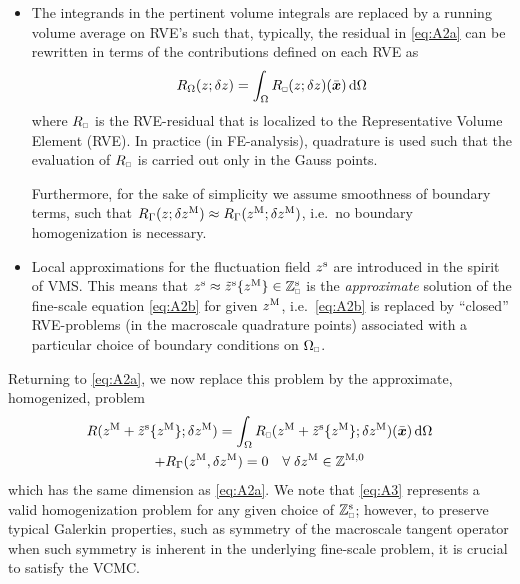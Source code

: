 \documentclass[MikaelDissertation.tex]{subfiles}
\begin{document}
\begin{itemize}
\item The integrands in the pertinent volume integrals are replaced by a running volume average on RVE's
such that, typically, the residual in \cref{eq:A2a} can be rewritten in terms of the contributions defined on each RVE as
\begin{align}
\label{eq:A106} R_\Omega(z;\delta z) = \int_\Omega R_\rve(z;\delta z)(\bar{\ta x})\dif\Omega
\end{align}
where $R_\rve$ is the RVE-residual that is localized to the Representative Volume Element (RVE).
In practice (in FE-analysis), quadrature is used such that the evaluation of $R_\rve$ is carried out only in the Gauss points.

Furthermore, for the sake of simplicity we assume smoothness of boundary terms, such that $R_\Gamma(z; \delta z^{\mathrm{M}}) \approx R_\Gamma(z^{\mathrm{M}};\delta z^{\mathrm{M}})$, i.e.\ no boundary homogenization is necessary.

\item Local approximations for the fluctuation field $z^{\mathrm{s}}$ are introduced in the spirit of VMS.
This means that $z^\fluct \approx \tilde{z}^\fluct\{z^\macro\}\in\set{Z}_\rve^{\fluct}$ is the \emph{approximate} solution of the fine-scale 
equation \cref{eq:A2b} for given $z^{\mathrm{M}}$, i.e.\ \cref{eq:A2b} is replaced by ``closed'' RVE-problems (in the macroscale quadrature points) associated with a particular choice of boundary conditions on $\Omega_\rve$.
\end{itemize}
Returning to \cref{eq:A2a}, we now replace this problem by the approximate, homogenized, problem
\begin{multline}
\label{eq:A3} R(z^\macro+\tilde{z}^\fluct\{z^\macro\};\delta z^\macro) = \int_\Omega R_\rve(z^\macro+\tilde{z}^\fluct\{z^\macro\};\delta z^\macro)(\bar{\ta x})\dif\Omega
 \\
 + R_\Gamma(z^\macro, \delta z^\macro) = 0 \quad \forall\;\delta z^\macro \in \set Z^{\macro,0}
\end{multline}
which has the same dimension as \cref{eq:A2a}.
We note that \cref{eq:A3} represents a valid homogenization problem for any given choice of $\set{Z}_\rve^{\fluct}$; however, to preserve typical Galerkin properties, such as symmetry of the macroscale tangent operator when such symmetry is inherent in the underlying fine-scale problem, it is crucial to satisfy the VCMC.
\end{document}
